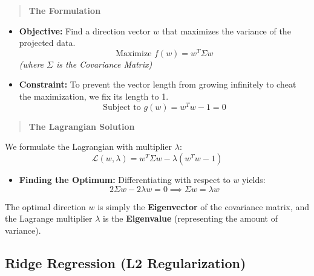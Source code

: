 \documentclass[
  letterpaper,
  DIV=11,
  numbers=noendperiod]{scrreprt}
\providecommand{\tightlist}{%
  \setlength{\itemsep}{0pt}\setlength{\parskip}{0pt}}
\begin{document}
\begin{quote}
\textbf{The Formulation}
\end{quote}

\begin{itemize}
\item
  \textbf{Objective:} Find a direction vector \(w\) that maximizes the
  variance of the projected data.
  \[\text{Maximize } f(w) = w^T \Sigma w\] \emph{(where \(\Sigma\) is
  the Covariance Matrix)}
\item
  \textbf{Constraint:} To prevent the vector length from growing
  infinitely to cheat the maximization, we fix its length to 1.
  \[\text{Subject to } g(w) = w^T w - 1 = 0\]
\end{itemize}

\begin{quote}
\textbf{The Lagrangian Solution}
\end{quote}

We formulate the Lagrangian with multiplier \(\lambda\):
\[\mathcal{L}(w, \lambda) = w^T \Sigma w - \lambda(w^T w - 1)\]

\begin{itemize}
\tightlist
\item
  \textbf{Finding the Optimum:} Differentiating with respect to \(w\)
  yields: \[2\Sigma w - 2\lambda w = 0 \implies \Sigma w = \lambda w\]
\end{itemize}

\begin{tcolorbox}[enhanced jigsaw, leftrule=.75mm, rightrule=.15mm, colback=white, colbacktitle=quarto-callout-note-color!10!white, arc=.35mm, opacityback=0, toptitle=1mm, bottomrule=.15mm, bottomtitle=1mm, titlerule=0mm, title=\textcolor{quarto-callout-note-color}{\faInfo}\hspace{0.5em}{Insight}, toprule=.15mm, left=2mm, coltitle=black, breakable, colframe=quarto-callout-note-color-frame, opacitybacktitle=0.6]

The optimal direction \(w\) is simply the \textbf{Eigenvector} of the
covariance matrix, and the Lagrange multiplier \(\lambda\) is the
\textbf{Eigenvalue} (representing the amount of variance).

\end{tcolorbox}

\subsection{Ridge Regression (L2
Regularization)}\label{ridge-regression-l2-regularization}
\end{document}
